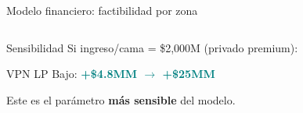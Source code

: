 \documentclass[aspectratio=169, 11pt]{beamer}
\newcommand{\highlight}[1]{\textcolor{teal}{\textbf{#1}}}
\begin{document}
\begin{frame}{Modelo financiero: factibilidad por zona}
\begin{columns}[T]
\vspace{4pt}
\begin{exampleblock}{\small Sensibilidad}
\footnotesize Si ingreso/cama = \$2,000M (privado premium):

\vspace{3pt}
VPN LP Bajo: \highlight{+\$4.8MM $\to$ +\$25MM}

\vspace{3pt}
Este es el parámetro \textbf{más sensible} del modelo.
\end{exampleblock}
\end{columns}
\end{frame}

\end{document}
